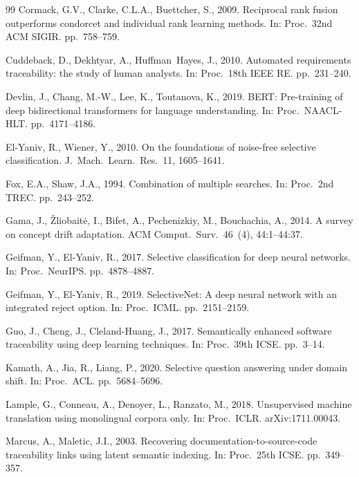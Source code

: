 \documentclass[a4paper,fleqn]{cas-sc}
\begin{document}
\begin{thebibliography}{99}
Cormack, G.V., Clarke, C.L.A., Buettcher, S., 2009. Reciprocal rank fusion outperforms condorcet and individual rank learning methods. In: Proc.\ 32nd ACM SIGIR. pp.\ 758--759.

Cuddeback, D., Dekhtyar, A., Huffman~Hayes, J., 2010. Automated requirements traceability: the study of human analysts. In: Proc.\ 18th IEEE RE. pp.\ 231--240.

Devlin, J., Chang, M.-W., Lee, K., Toutanova, K., 2019. BERT: Pre-training of deep bidirectional transformers for language understanding. In: Proc.\ NAACL-HLT. pp.\ 4171--4186.

El-Yaniv, R., Wiener, Y., 2010. On the foundations of noise-free selective classification. J.\ Mach.\ Learn.\ Res.\ 11, 1605--1641.

Fox, E.A., Shaw, J.A., 1994. Combination of multiple searches. In: Proc.\ 2nd TREC. pp.\ 243--252.

Gama, J., \v{Z}liobait\.{e}, I., Bifet, A., Pechenizkiy, M., Bouchachia, A., 2014. A survey on concept drift adaptation. ACM Comput.\ Surv.\ 46~(4), 44:1--44:37.

Geifman, Y., El-Yaniv, R., 2017. Selective classification for deep neural networks. In: Proc.\ NeurIPS. pp.\ 4878--4887.

Geifman, Y., El-Yaniv, R., 2019. SelectiveNet: A deep neural network with an integrated reject option. In: Proc.\ ICML. pp.\ 2151--2159.

Guo, J., Cheng, J., Cleland-Huang, J., 2017. Semantically enhanced software traceability using deep learning techniques. In: Proc.\ 39th ICSE. pp.\ 3--14.

Kamath, A., Jia, R., Liang, P., 2020. Selective question answering under domain shift. In: Proc.\ ACL. pp.\ 5684--5696.

Lample, G., Conneau, A., Denoyer, L., Ranzato, M., 2018. Unsupervised machine translation using monolingual corpora only. In: Proc.\ ICLR. arXiv:1711.00043.

Marcus, A., Maletic, J.I., 2003. Recovering documentation-to-source-code traceability links using latent semantic indexing. In: Proc.\ 25th ICSE. pp.\ 349--357.


\end{thebibliography}
\end{document}
